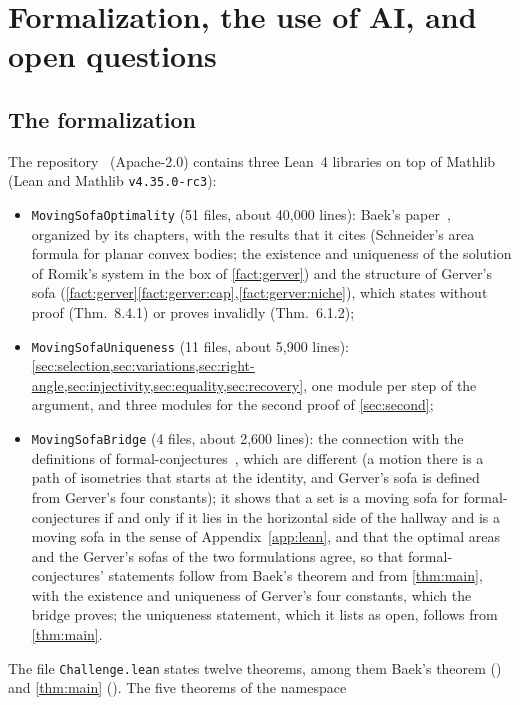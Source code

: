 \section{Formalization, the use of AI, and open questions}\label{sec:formalization}

\subsection{The formalization}

The repository~\cite{Companion} (Apache-2.0) contains three Lean~4 libraries on
top of Mathlib (Lean and Mathlib \texttt{v4.35.0-rc3}):
\begin{itemize}
\item \texttt{MovingSofaOptimality} (51 files, about 40,000 lines): Baek's
paper~\cite{Baek}, organized by its chapters, with the results that it cites
(Schneider's area formula for planar convex bodies; the existence and uniqueness
of the solution of Romik's system in the box of \cref{fact:gerver}) and the
structure of Gerver's sofa
(\cref{fact:gerver}\ref{fact:gerver:cap},\ref{fact:gerver:niche}), which
\cite{Baek} states without proof (Thm.~8.4.1) or proves invalidly (Thm.~6.1.2);
\item \texttt{MovingSofaUniqueness} (11 files, about 5,900 lines):
\cref{sec:selection,sec:variations,sec:right-angle,sec:injectivity,sec:equality,sec:recovery},
one module per step of the argument, and three modules for the second proof of
\cref{sec:second};
\item \texttt{MovingSofaBridge} (4 files, about 2,600 lines): the connection
with the definitions of formal-conjectures~\cite{FormalConjectures}, which are
different (a motion there is a path of isometries that starts at the identity,
and Gerver's sofa is defined from Gerver's four constants); it shows that a set
is a moving sofa for formal-conjectures if and only if it lies in the horizontal
side of the hallway and is a moving sofa in the sense of
Appendix~\ref{app:lean}, and that the optimal areas and the Gerver's sofas of
the two formulations agree, so that formal-conjectures' statements follow from
Baek's theorem and from \cref{thm:main}, with the existence and uniqueness of
Gerver's four constants, which the bridge proves; the uniqueness statement,
which it lists as open, follows from \cref{thm:main}.
\end{itemize}
The file \texttt{Challenge.lean} states twelve theorems, among them Baek's
theorem () and \cref{thm:main}
(). The five theorems of the namespace
